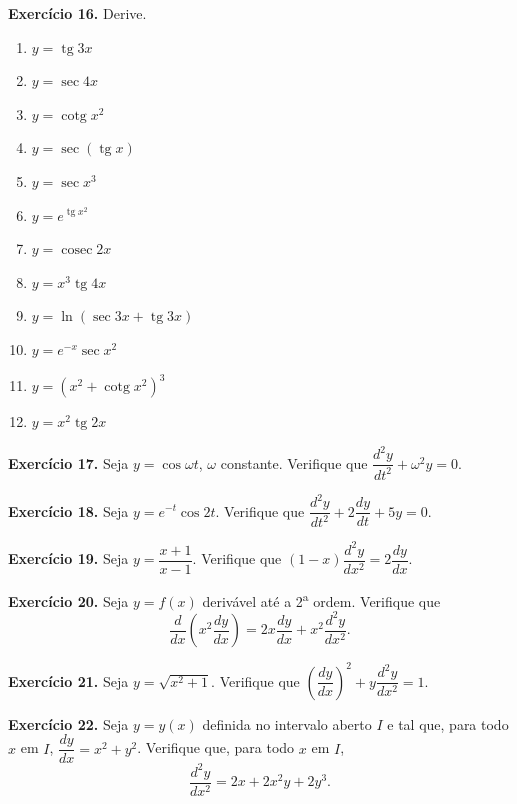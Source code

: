 \documentclass[12pt,a4paper]{article}
\begin{document}
\vspace{0.5cm}
\noindent\textbf{Exercício 16.} Derive.
\begin{enumerate}
    \renewcommand{\theenumi}{\alph{enumi}}
    \renewcommand{\labelenumi}{\theenumi)}
    \item $y = \operatorname{tg} 3x$
    \item $y = \sec 4x$
    \item $y = \operatorname{cotg} x^2$
    \item $y = \sec(\operatorname{tg} x)$
    \item $y = \sec x^3$
    \item $y = e^{\operatorname{tg} x^2}$
    \item $y = \operatorname{cosec} 2x$
    \item $y = x^3 \operatorname{tg} 4x$
    \item $y = \ln(\sec 3x + \operatorname{tg} 3x)$
    \item $y = e^{-x}\sec x^2$
    \item $y = (x^2 + \operatorname{cotg} x^2)^3$
    \item $y = x^2 \operatorname{tg} 2x$
\end{enumerate}

\vspace{0.5cm}
\noindent\textbf{Exercício 17.}
Seja $y = \cos \omega t$, $\omega$ constante. Verifique que $\dfrac{d^2 y}{dt^2} + \omega^2 y = 0$.

\vspace{0.5cm}
\noindent\textbf{Exercício 18.}
Seja $y = e^{-t}\cos 2t$. Verifique que $\dfrac{d^2 y}{dt^2} + 2\dfrac{dy}{dt} + 5y = 0$.

\vspace{0.5cm}
\noindent\textbf{Exercício 19.}
Seja $y = \dfrac{x + 1}{x - 1}$. Verifique que $(1 - x)\dfrac{d^2 y}{dx^2} = 2\dfrac{dy}{dx}$.

\vspace{0.5cm}
\noindent\textbf{Exercício 20.}
Seja $y = f(x)$ derivável até a 2\textsuperscript{a} ordem. Verifique que
\[
\dfrac{d}{dx}\!\left(x^2 \dfrac{dy}{dx}\right) = 2x\dfrac{dy}{dx} + x^2 \dfrac{d^2 y}{dx^2}.
\]

\vspace{0.5cm}
\noindent\textbf{Exercício 21.}
Seja $y = \sqrt{x^2 + 1}$. Verifique que $\left(\dfrac{dy}{dx}\right)^{\!2} + y\dfrac{d^2 y}{dx^2} = 1$.

\vspace{0.5cm}
\noindent\textbf{Exercício 22.}
Seja $y = y(x)$ definida no intervalo aberto $I$ e tal que, para todo $x$ em $I$, $\dfrac{dy}{dx} = x^2 + y^2$. Verifique que, para todo $x$ em $I$,
\[
\dfrac{d^2 y}{dx^2} = 2x + 2x^2 y + 2y^3.
\]
\end{document}
